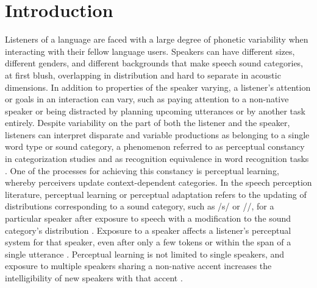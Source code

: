 
\chapter{Introduction}

Listeners of a language are faced with a large degree of phonetic variability when interacting with their fellow language users.  
Speakers can have different sizes, different genders, and different backgrounds that make speech sound categories, at first blush, overlapping in distribution and hard to separate in acoustic dimensions.
In addition to properties of the speaker varying, a listener's attention or goals in an interaction can vary, such as paying attention to a non-native speaker or being distracted by planning upcoming utterances or by another task entirely.  
Despite variability on the part of both the listener and the speaker, listeners can interpret disparate and variable productions as belonging to a single word type or sound category, a phenomenon referred to as perceptual constancy in categorization studies \citep{Shankweiler1977, Kuhl1979} and as recognition equivalence in word recognition tasks \citep{Sumner2013}.
One of the processes for achieving this constancy is perceptual learning, whereby perceivers update context-dependent categories.
In the speech perception literature, perceptual learning or perceptual adaptation refers to the updating of distributions corresponding to a sound category, such as /s/ or /\textesh/, for a particular speaker after exposure to speech with a modification to the sound category's distribution \citep{Norris2003}.
Exposure to a speaker affects a listener's perceptual system for that speaker,  even after only a few tokens \citep{Vroomen2007, Kraljic2008} or within the span of a single utterance \citep{Ladefoged1957}.
Perceptual learning is not limited to single speakers, and exposure to multiple speakers sharing a non-native accent increases the intelligibility of new speakers with that accent \citep{Bradlow2008}.

%

